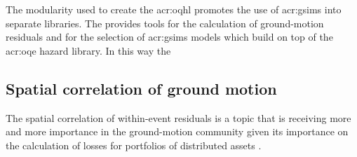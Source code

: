The modularity used to create the {acr:oqhl} promotes the use of 
\glspl{acr:gsim} into separate libraries. The %
\parencite{weatherill2014} provides tools for the calculation of ground-motion
residuals and for the selection of \glspl{acr:gsim} models which build on top 
of the \gls{acr:oqe} hazard library. In this way the 
%
\subsection{Spatial correlation of ground motion}
The spatial correlation of within-event residuals is a topic that is 
receiving more and more importance in the ground-motion community given 
its importance on the calculation of losses for portfolios of distributed 
assets \parencite{crowley2006}.
